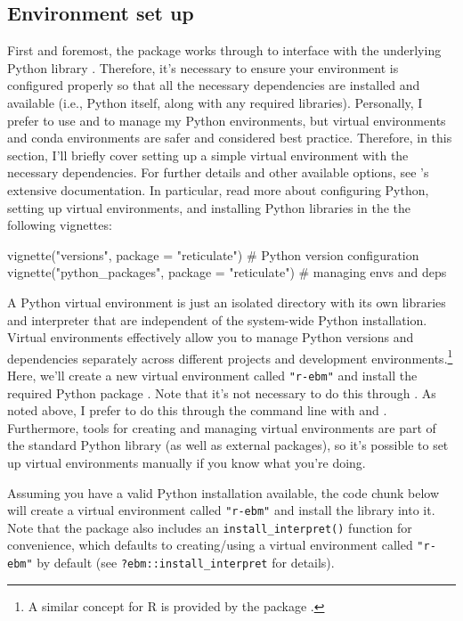 \subsection{Environment set up}\label{environment-set-up}

First and foremost, the  package works through 
to interface with the underlying Python library .
Therefore, it's necessary to ensure your environment is configured
properly so that all the necessary dependencies are installed and
available (i.e., Python itself, along with any required libraries).
Personally, I prefer to use  \citep{Py-pip} and 
\citep{Py-pyenv} to manage my Python environments, but virtual
environments and conda environments are safer and considered best
practice. Therefore, in this section, I'll briefly cover setting up a
simple virtual environment with the necessary dependencies. For further
details and other available options, see 's extensive
documentation. In particular, read more about configuring Python,
setting up virtual environments, and installing Python libraries in the
the following vignettes:

\begin{Schunk}
\begin{Sinput}
vignette("versions", package = "reticulate")  # Python version configuration
vignette("python_packages", package = "reticulate")  # managing envs and deps
\end{Sinput}
\end{Schunk}

A Python virtual environment is just an isolated directory with its own
libraries and interpreter that are independent of the system-wide Python
installation. Virtual environments effectively allow you to manage
Python versions and dependencies separately across different projects
and development environments.\footnote{A similar concept for R is
  provided by the  package \citep{r-renv}.} Here, we'll
create a new virtual environment called \texttt{"r-ebm"} and install the
required Python package . Note that it's not necessary to
do this through . As noted above, I prefer to do this
through the command line with  and . Furthermore,
tools for creating and managing virtual environments are part of the
standard Python library (as well as external packages), so it's possible
to set up virtual environments manually if you know what you're doing.

Assuming you have a valid Python installation available, the code chunk
below will create a virtual environment called \texttt{"r-ebm"} and
install the  library into it. Note that the 
package also includes an \texttt{install\_interpret()} function for
convenience, which defaults to creating/using a virtual environment
called \texttt{"r-ebm"} by default (see
\texttt{?ebm::install\_interpret} for details).

